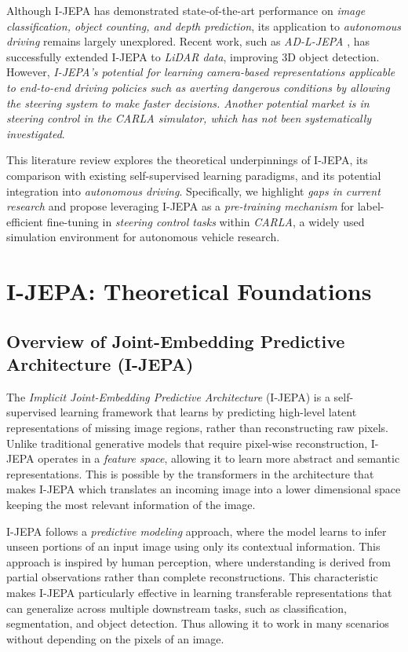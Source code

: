 \documentclass{article}
\begin{document}
Although I-JEPA has demonstrated state-of-the-art performance on \textit{image classification, object counting, and depth prediction}, its application to \textit{autonomous driving} remains largely unexplored. Recent work, such as \textit{AD-L-JEPA} \citep{zhu2025ad}, has successfully extended I-JEPA to \textit{LiDAR data}, improving 3D object detection. However, \textit{I-JEPA’s potential for learning camera-based representations applicable to end-to-end driving policies such as averting dangerous conditions by allowing the steering system to make faster decisions. Another potential market is in steering control in the CARLA simulator, which has not been systematically investigated}. 

This literature review explores the theoretical underpinnings of I-JEPA, its comparison with existing self-supervised learning paradigms, and its potential integration into \textit{autonomous driving}. Specifically, we highlight \textit{gaps in current research} and propose leveraging I-JEPA as a \textit{pre-training mechanism} for label-efficient fine-tuning in \textit{steering control tasks} within \textit{CARLA}, a widely used simulation environment for autonomous vehicle research.
\section{I-JEPA: Theoretical Foundations}

\subsection{Overview of Joint-Embedding Predictive Architecture (I-JEPA)}
The \textit{Implicit Joint-Embedding Predictive Architecture} (I-JEPA) \citep{assran2023self} is a self-supervised learning framework that learns by predicting high-level latent representations of missing image regions, rather than reconstructing raw pixels. Unlike traditional generative models that require pixel-wise reconstruction, I-JEPA operates in a \textit{feature space}, allowing it to learn more abstract and semantic representations. This is possible by the transformers in the architecture that makes I-JEPA which translates an incoming image into a lower dimensional space keeping the most relevant information of the image. 

I-JEPA follows a \textit{predictive modeling} approach, where the model learns to infer unseen portions of an input image using only its contextual information. This approach is inspired by human perception, where understanding is derived from partial observations rather than complete reconstructions. This characteristic makes I-JEPA particularly effective in learning transferable representations that can generalize across multiple downstream tasks, such as classification, segmentation, and object detection. Thus allowing it to work in many scenarios without depending on the pixels of an image. 
\end{document}
